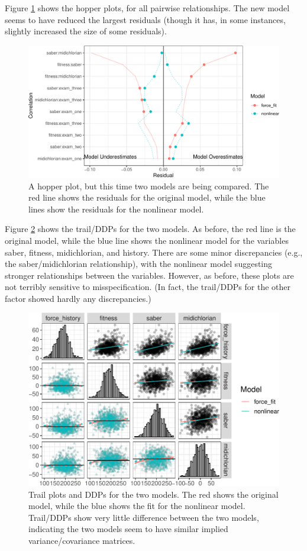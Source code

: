 \documentclass[
  english,
  man]{apa6}
\begin{document}
Figure \ref{fig:hopperModcomp} shows the hopper plots, for all pairwise relationships. The new model seems to have reduced the largest residuals (though it has, in some instances, slightly increased the size of some residuals).

\begin{figure}

{\centering \includegraphics[width=0.6\linewidth]{flexplavaan_draft_files/figure-latex/hopperModcomp-1} 

}

\caption{A hopper plot, but this time two models are being compared. The red line shows the residuals for the original model, while the blue lines show the residuals for the nonlinear model.}\label{fig:hopperModcomp}
\end{figure}

Figure \ref{fig:trailnl} shows the trail/DDPs for the two models. As before, the red line is the original model, while the blue line shows the nonlinear model for the variables saber, fitness, midichlorian, and history. There are some minor discrepancies (e.g., the saber/midichlorian relationship), with the nonlinear model suggesting stronger relationships between the variables. However, as before, these plots are not terribly sensitive to misspecification. (In fact, the trail/DDPs for the other factor showed hardly any discrepancies.)

\begin{figure}

{\centering \includegraphics[width=0.9\linewidth]{flexplavaan_draft_files/figure-latex/trailnl-1} 

}

\caption{Trail plots and DDPs for the two models. The red shows the original model, while the blue shows the fit for the nonlinear model. Trail/DDPs show very little difference between the two models, indicating the two models seem to have similar implied variance/covariance matrices.}\label{fig:trailnl}
\end{figure}
\end{document}
